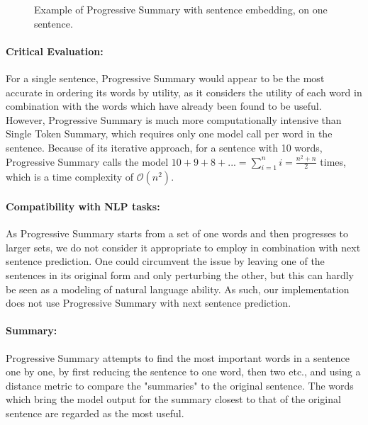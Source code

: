 \begin{figure}[H]
	
	\caption{Example of Progressive Summary with sentence embedding, on one sentence.}
	\label{fig:progressive-summary}
\end{figure}

\paragraph{Critical Evaluation:}
For a single sentence, Progressive Summary would appear to be the most accurate in ordering its words by utility, as it considers the utility of each word in combination with the words which have already been found to be useful.
However, Progressive Summary is much more computationally intensive than Single Token Summary, which requires only one model call per word in the sentence.
Because of its iterative approach, for a sentence with 10 words, Progressive Summary calls the model $10+9+8+... = \sum_{i=1}^{n}i = \frac{n^2 + n}{2}$ times, which is a time complexity of $\mathcal{O}(n^2)$.

\paragraph{Compatibility with NLP tasks:}
As Progressive Summary starts from a set of one words and then progresses to larger sets, we do not consider it appropriate to employ in combination with next sentence prediction.
One could circumvent the issue by leaving one of the sentences in its original form and only perturbing the other, but this can hardly be seen as a modeling of natural language ability.
As such, our implementation does not use Progressive Summary with next sentence prediction.

\paragraph{Summary:}
Progressive Summary attempts to find the most important words in a sentence one by one, by first reducing the sentence to one word, then two etc., and using a distance metric to compare the "summaries" to the original sentence.
The words which bring the model output for the summary closest to that of the original sentence are regarded as the most useful.

